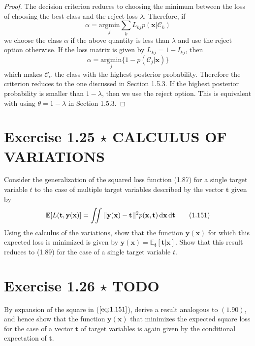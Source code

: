 \vspace{1em}

\begin{proof}
    The decision criterion reduces to choosing the minimum between the loss
    of choosing the best class and the reject loss $\lambda$. Therefore, if
    \[
        \alpha = \underset{j}{\mathrm{argmin}} \sum_k L_{kj}p(\mathbf{x} | \mathcal{C}_k)
    \] 
    we choose the class $\alpha$ if the above quantity is less than $\lambda$ 
    and use the reject option otherwise. If the loss matrix is given
    by $L_{kj} = 1 - I_{kj}$, then 
    \[
        \alpha = \underset{j}{\mathrm{argmin}} \{1 - p(\mathcal{C}_j | \mathbf{x})\}
    \] 
    which makes $\mathcal{C}_{\alpha}$ the class with the highest posterior probability.
    Therefore the criterion reduces to the one discussed in Section 1.5.3.
    If the highest posterior probability is smaller than $1 - \lambda$, then
    we use the reject option. This is equivalent with using $\theta = 1 - \lambda$
    in Section 1.5.3.
\end{proof}

\section*{Exercise 1.25 $\star$ CALCULUS OF VARIATIONS}
Consider the generalization of the squared loss function (1.87) for
a single target variable $t$ to the case of multiple target variables
described by the vector $\mathbf{t}$ given by
\begin{equation*}
    \mathbb{E}[L(\mathbf{t}, \mathbf{y}(\mathbf{x})] 
    = \iint ||\mathbf{y}(\mathbf{x}) - \mathbf{t}||^2 p(\mathbf{x}, \mathbf{t}) 
    \mathop{}\!\mathrm{d} \mathbf{x} \mathop{}\!\mathrm{d} \mathbf{t}
    \tag{1.151}\label{eq:1.151}
\end{equation*}
Using the calculus of the variations, show that the function $\mathbf{y}(\mathbf{x})$ for
which this expected loss is minimized is given by 
$\mathbf{y}(\mathbf{x}) = \mathbb{E}_{\mathbf{t}}[\mathbf{t}|\mathbf{x}]$. 
Show that this result reduces to (1.89) for the case of a single target variable $t$. 

\section*{Exercise 1.26 $\star$ TODO}
By expansion of the square in ($\ref{eq:1.151}$), derive a result analogous to
$(1.90)$, and hence show that the function $\mathbf{y}(\mathbf{x})$ that
minimizes the expected square loss for the case of a vector $\mathbf{t}$ 
of target variables is again given by the conditional expectation of $\mathbf{t}$.

